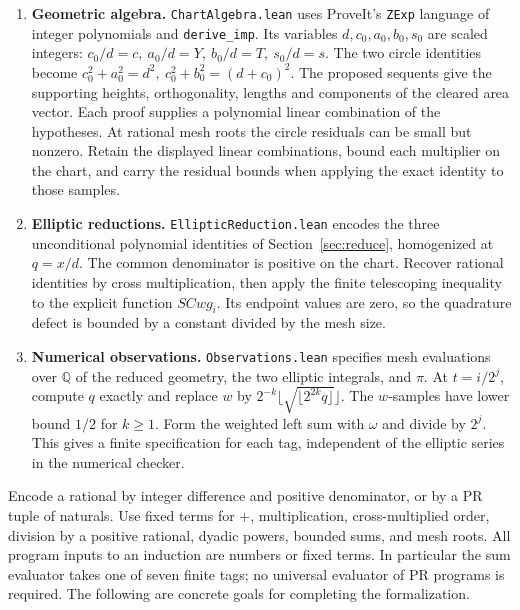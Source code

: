 \documentclass[11pt,letterpaper]{article}
\newcommand{\subt}[1]{\par\medskip\noindent{\color{sea}\bfseries #1}\enspace}
\newcommand{\Q}{\mathbb Q}\newcommand{\N}{\mathbb N}
\begin{document}
\begin{enumerate}[leftmargin=1.5em,itemsep=5pt]
\item \textbf{Geometric algebra.} \texttt{ChartAlgebra.lean} uses ProveIt's \texttt{ZExp} language of integer polynomials and \texttt{derive\_imp}. Its variables \(d,c_0,a_0,b_0,s_0\) are scaled integers: \(c_0/d=c,\ a_0/d=Y,\ b_0/d=T,\ s_0/d=s\). The two circle identities become \(c_0^2+a_0^2=d^2,\ c_0^2+b_0^2=(d+c_0)^2\). The proposed sequents give the supporting heights, orthogonality, lengths and components of the cleared area vector. Each proof supplies a polynomial linear combination of the hypotheses. At rational mesh roots the circle residuals can be small but nonzero. Retain the displayed linear combinations, bound each multiplier on the chart, and carry the residual bounds when applying the exact identity to those samples.
\item \textbf{Elliptic reductions.} \texttt{EllipticReduction.lean} encodes the three unconditional polynomial identities of Section~\ref{sec:reduce}, homogenized at \(q=x/d\). The common denominator is positive on the chart. Recover rational identities by cross multiplication, then apply the finite telescoping inequality to the explicit function \(SCw g_i\). Its endpoint values are zero, so the quadrature defect is bounded by a constant divided by the mesh size.
\item \textbf{Numerical observations.} \texttt{Observations.lean} specifies mesh evaluations over \(\Q\) of the reduced geometry, the two elliptic integrals, and \(\pi\). At \(t=i/2^j\), compute \(q\) exactly and replace \(w\) by \(2^{-k}\lfloor\sqrt{\lfloor 2^{2k}q\rfloor}\rfloor\). The \(w\)-samples have lower bound \(1/2\) for \(k\ge1\). Form the weighted left sum with \(\omega\) and divide by \(2^j\). This gives a finite specification for each tag, independent of the elliptic series in the numerical checker.
\end{enumerate}

\subt{Object-language milestones.}
Encode a rational by integer difference and positive denominator, or by a PR tuple of naturals. Use fixed terms for \(+\), multiplication, cross-multiplied order, division by a positive rational, dyadic powers, bounded sums, and mesh roots. All program inputs to an induction are numbers or fixed terms. In particular the sum evaluator takes one of seven finite tags; no universal evaluator of PR programs is required. The following are concrete goals for completing the formalization.
\end{document}
